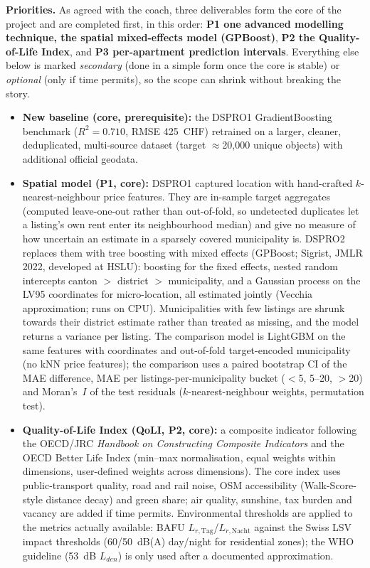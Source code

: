 \documentclass[11pt,a4paper]{article}
\begin{document}
\textbf{Priorities.} As agreed with the coach, three deliverables form the core of the project and are completed first, in this order: \textbf{P1 one advanced modelling technique, the spatial mixed-effects model (GPBoost)}, \textbf{P2 the Quality-of-Life Index}, and \textbf{P3 per-apartment prediction intervals}. Everything else below is marked \emph{secondary} (done in a simple form once the core is stable) or \emph{optional} (only if time permits), so the scope can shrink without breaking the story.
\begin{itemize}
    \item \textbf{New baseline (core, prerequisite):} the DSPRO1 GradientBoosting benchmark ($R^2 = 0.710$, RMSE 425~CHF) retrained on a larger, cleaner, deduplicated, multi-source dataset (target $\approx$20{,}000 unique objects) with additional official geodata.
    \item \textbf{Spatial model (P1, core):} DSPRO1 captured location with hand-crafted $k$-nearest-neighbour price features. They are in-sample target aggregates (computed leave-one-out rather than out-of-fold, so undetected duplicates let a listing's own rent enter its neighbourhood median) and give no measure of how uncertain an estimate in a sparsely covered municipality is. DSPRO2 replaces them with tree boosting with mixed effects (GPBoost; Sigrist, JMLR 2022, developed at HSLU): boosting for the fixed effects, nested random intercepts canton $>$ district $>$ municipality, and a Gaussian process on the LV95 coordinates for micro-location, all estimated jointly (Vecchia approximation; runs on CPU). Municipalities with few listings are shrunk towards their district estimate rather than treated as missing, and the model returns a variance per listing. The comparison model is LightGBM on the same features with coordinates and out-of-fold target-encoded municipality (no kNN price features); the comparison uses a paired bootstrap CI of the MAE difference, MAE per listings-per-municipality bucket ($<$5, 5--20, $>$20) and Moran's~$I$ of the test residuals ($k$-nearest-neighbour weights, permutation test).
    \item \textbf{Quality-of-Life Index (QoLI, P2, core):} a composite indicator following the OECD/JRC \emph{Handbook on Constructing Composite Indicators} and the OECD Better Life Index (min--max normalisation, equal weights within dimensions, user-defined weights across dimensions). The core index uses public-transport quality, road and rail noise, OSM accessibility (Walk-Score-style distance decay) and green share; air quality, sunshine, tax burden and vacancy are added if time permits. Environmental thresholds are applied to the metrics actually available: BAFU $L_{r,\mathrm{Tag}}$/$L_{r,\mathrm{Nacht}}$ against the Swiss LSV impact thresholds (60/50~dB(A) day/night for residential zones); the WHO guideline (53~dB $L_{den}$) is only used after a documented approximation.

\end{itemize}
\end{document}
